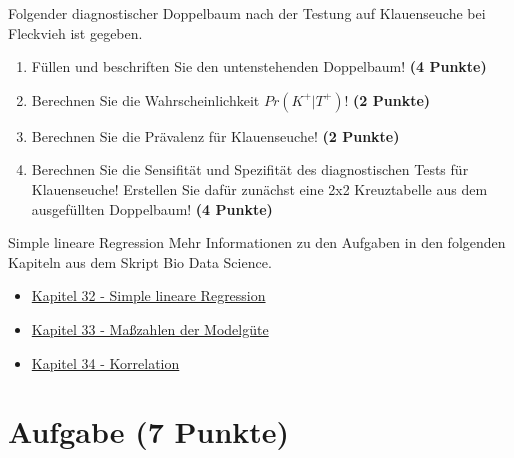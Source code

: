 \documentclass[a4paper, 10pt]{scrartcl}\usepackage[]{graphicx}\usepackage[]{xcolor}
\begin{document}
Folgender diagnostischer Doppelbaum nach der Testung auf Klauenseuche bei
Fleckvieh ist gegeben.

\begin{enumerate}
\item F{\"u}llen und beschriften Sie den untenstehenden Doppelbaum! \textbf{(4
    Punkte)}
\item Berechnen Sie die Wahrscheinlichkeit $Pr(K^+|T^+)$! \textbf{(2 Punkte)}
\item Berechnen Sie die Pr{\"a}valenz f{\"u}r Klauenseuche! \textbf{(2 Punkte)}
\item Berechnen Sie die Sensifit{\"a}t und Spezifit{\"a}t des diagnostischen Tests
  f{\"u}r Klauenseuche! Erstellen Sie daf{\"u}r zun{\"a}chst eine 2x2 Kreuztabelle aus
  dem ausgef{\"u}llten Doppelbaum!
  \textbf{(4 Punkte)}
\end{enumerate}

\vspace{1cm}
 




 
\clearpage
\begin{graybox}{Simple lineare Regression}
Mehr Informationen zu den Aufgaben in den folgenden Kapiteln aus dem Skript Bio Data Science.
  \begin{itemize}
  \item \href{https://jkruppa.github.io/stat-linear-reg-basic.html}{Kapitel 32 - Simple lineare Regression}
  \item \href{https://jkruppa.github.io/stat-linear-reg-quality.html}{Kapitel 33 - Maßzahlen der Modelgüte}
  \item \href{https://jkruppa.github.io/stat-linear-reg-corr.html}{Kapitel 34 - Korrelation}
  \end{itemize}
\end{graybox}
\clearpage

\section{Aufgabe \hfill (7 Punkte)}
\end{document}
